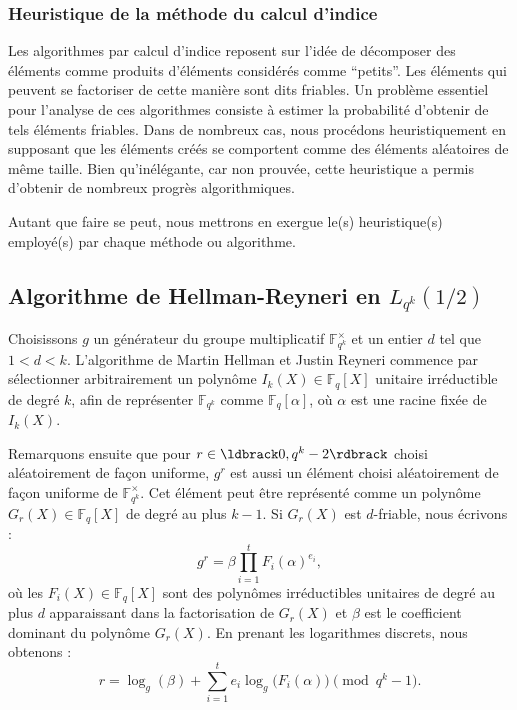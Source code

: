 \documentclass[a4paper, titlepage, 11pt]{article}
\theoremstyle{definition}
\theoremstyle{remark}
\def\gf #1{\mathbb{F}_{#1}}
\begin{document}
\subsubsection{Heuristique de la méthode du calcul d'indice}

Les algorithmes par calcul d'indice reposent sur l'idée de décomposer des éléments comme produits d'éléments considérés comme ``petits''. Les éléments qui peuvent se factoriser de cette manière sont dits friables. Un problème essentiel pour l'analyse de ces algorithmes consiste à estimer la probabilité d'obtenir de tels éléments friables. Dans de nombreux cas, nous procédons heuristiquement en supposant que les éléments créés se comportent comme des éléments aléatoires de même taille. Bien qu'inélégante, car non prouvée, cette heuristique a permis d'obtenir de nombreux progrès algorithmiques.

Autant que faire se peut, nous mettrons en exergue le(s) heuristique(s) employé(s) par chaque méthode ou algorithme.

\subsection{Algorithme de Hellman-Reyneri en $L_{q^k}(1/2)$}

Choisissons $g$ un générateur du groupe multiplicatif $\gf{q^k}^\times$ et un entier $d$ tel que $1 < d < k$. L'algorithme de Martin Hellman et Justin Reyneri \cite{hellman1982} commence par sélectionner arbitrairement un polynôme $I_k(X) \in \gf{q}[X]$ unitaire irréductible de degré $k$, afin de représenter $\gf{q^k}$ comme $\gf{q}[\alpha]$, où $\alpha$ est une racine fixée de $I_k(X)$.

Remarquons ensuite que pour $r \in \ldbrack 0, q^k - 2 \rdbrack$ choisi aléatoirement de façon uniforme, $g^r$ est aussi un élément choisi aléatoirement de façon uniforme de $\gf{q^k}^\times$. Cet élément peut être représenté comme un polynôme $G_r(X) \in \gf{q}[X]$ de degré au plus $k-1$. Si $G_r(X)$ est $d$-friable, nous écrivons :
$$g^r = \beta \prod_{i=1}^{t} F_i(\alpha)^{e_i},$$
où les $F_i(X)\in \gf{q}[X]$ sont des polynômes irréductibles unitaires de degré au plus $d$ apparaissant dans la factorisation de $G_r(X)$ et $\beta$ est le coefficient dominant du polynôme $G_r(X)$. En prenant les logarithmes discrets, nous obtenons :
\begin{equation}\label{eqn:hellman-reyneri}
r = \log_g(\beta) + \sum_{i=1}^t e_i\log_g\big(F_i(\alpha)\big) \pmod{q^k - 1}.
\end{equation}
\end{document}

